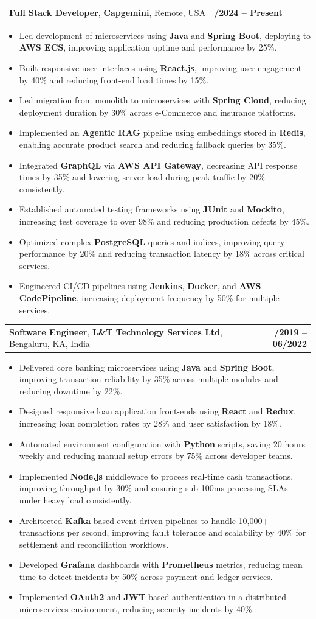 \documentclass[letterpaper,11pt]{article}
\makeatletter
\newcommand{\resumeItem}[1]{
  \item\footnotesize{
    {#1 \vspace{-2pt}}
  }
}
\newcommand{\resumeSubheading}[4]{
  \vspace{-2pt}\item
    \begin{tabular*}{1.0\textwidth}[t]{l@{\extracolsep{\fill}}r}
      \textbf{\fontsize{10pt}{14pt}\selectfont #3}, \textbf{\fontsize{10pt}{14pt}\selectfont #1}, \fontsize{10pt}{14pt}\selectfont #4 & \textbf{\fontsize{10pt}{14pt}\selectfont #2} \\
    \end{tabular*}\vspace{-7pt}
}
\newcommand{\resumeItemListStart}{\begin{itemize}[leftmargin=*]}
\newcommand{\resumeItemListEnd}{\end{itemize}\vspace{-5pt}}
\makeatother
\begin{document}
    \resumeSubheading
        {Capgemini}{01/2024 -- Present}
        {Full Stack Developer}{Remote, USA}
      \resumeItemListStart
        \resumeItem{Led development of microservices using \textbf{Java} and \textbf{Spring Boot}, deploying to \textbf{AWS ECS}, improving application uptime and performance by 25\%.}
        \resumeItem{Built responsive user interfaces using \textbf{React.js}, improving user engagement by 40\% and reducing front-end load times by 15\%.}
        \resumeItem{Led migration from monolith to microservices with \textbf{Spring Cloud}, reducing deployment duration by 30\% across e-Commerce and insurance platforms.}
        \resumeItem{Implemented an \textbf{Agentic RAG} pipeline using embeddings stored in \textbf{Redis}, enabling accurate product search and reducing fallback queries by 35\%.}
        \resumeItem{Integrated \textbf{GraphQL} via \textbf{AWS API Gateway}, decreasing API response times by 35\% and lowering server load during peak traffic by 20\% consistently.}
        \resumeItem{Established automated testing frameworks using \textbf{JUnit} and \textbf{Mockito}, increasing test coverage to over 98\% and reducing production defects by 45\%.}
        \resumeItem{Optimized complex \textbf{PostgreSQL} queries and indices, improving query performance by 20\% and reducing transaction latency by 18\% across critical services.}
        \resumeItem{Engineered CI/CD pipelines using \textbf{Jenkins}, \textbf{Docker}, and \textbf{AWS CodePipeline}, increasing deployment frequency by 50\% for multiple services.}
      \resumeItemListEnd

    \resumeSubheading
        {L\&T Technology Services Ltd}{08/2019 -- 06/2022}
        {Software Engineer}{Bengaluru, KA, India}
      \resumeItemListStart
        \resumeItem{Delivered core banking microservices using \textbf{Java} and \textbf{Spring Boot}, improving transaction reliability by 35\% across multiple modules and reducing downtime by 22\%.}
        \resumeItem{Designed responsive loan application front-ends using \textbf{React} and \textbf{Redux}, increasing loan completion rates by 28\% and user satisfaction by 18\%.}
        \resumeItem{Automated environment configuration with \textbf{Python} scripts, saving 20 hours weekly and reducing manual setup errors by 75\% across developer teams.}
        \resumeItem{Implemented \textbf{Node.js} middleware to process real-time cash transactions, improving throughput by 30\% and ensuring sub-100ms processing SLAs under heavy load consistently.}
        \resumeItem{Architected \textbf{Kafka}-based event-driven pipelines to handle 10,000+ transactions per second, improving fault tolerance and scalability by 40\% for settlement and reconciliation workflows.}
        \resumeItem{Developed \textbf{Grafana} dashboards with \textbf{Prometheus} metrics, reducing mean time to detect incidents by 50\% across payment and ledger services.}
        \resumeItem{Implemented \textbf{OAuth2} and \textbf{JWT}-based authentication in a distributed microservices environment, reducing security incidents by 40\%.}
      \resumeItemListEnd
\end{document}
